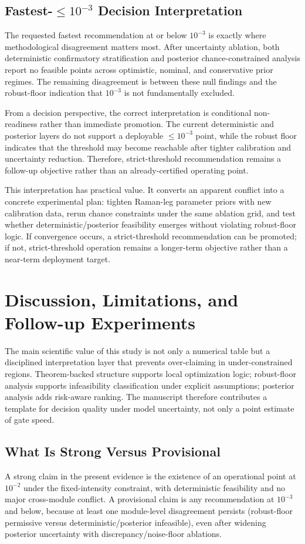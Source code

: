 \documentclass{article} %
\begin{document}
\subsection{Fastest-\texorpdfstring{$\le 10^{-3}$}{<=1e-3} Decision Interpretation}
The requested fastest recommendation at or below $10^{-3}$ is exactly where methodological disagreement matters most. After uncertainty ablation, both deterministic confirmatory stratification and posterior chance-constrained analysis report no feasible points across optimistic, nominal, and conservative prior regimes. The remaining disagreement is between these null findings and the robust-floor indication that $10^{-3}$ is not fundamentally excluded.

From a decision perspective, the correct interpretation is conditional non-readiness rather than immediate promotion. The current deterministic and posterior layers do not support a deployable $\le 10^{-3}$ point, while the robust floor indicates that the threshold may become reachable after tighter calibration and uncertainty reduction. Therefore, strict-threshold recommendation remains a follow-up objective rather than an already-certified operating point.

This interpretation has practical value. It converts an apparent conflict into a concrete experimental plan: tighten Raman-leg parameter priors with new calibration data, rerun chance constraints under the same ablation grid, and test whether deterministic/posterior feasibility emerges without violating robust-floor logic. If convergence occurs, a strict-threshold recommendation can be promoted; if not, strict-threshold operation remains a longer-term objective rather than a near-term deployment target.

\section{Discussion, Limitations, and Follow-up Experiments}
\label{sec:discussion}
The main scientific value of this study is not only a numerical table but a disciplined interpretation layer that prevents over-claiming in under-constrained regions. Theorem-backed structure supports local optimization logic; robust-floor analysis supports infeasibility classification under explicit assumptions; posterior analysis adds risk-aware ranking. The manuscript therefore contributes a template for decision quality under model uncertainty, not only a point estimate of gate speed.

\subsection{What Is Strong Versus Provisional}
A strong claim in the present evidence is the existence of an operational point at $10^{-2}$ under the fixed-intensity constraint, with deterministic feasibility and no major cross-module conflict. A provisional claim is any recommendation at $10^{-3}$ and below, because at least one module-level disagreement persists (robust-floor permissive versus deterministic/posterior infeasible), even after widening posterior uncertainty with discrepancy/noise-floor ablations.
\end{document}
